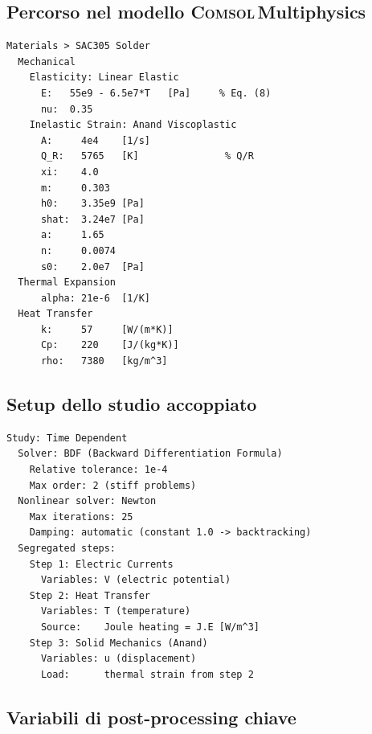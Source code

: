 \documentclass[11pt,a4paper]{article}
\newcommand{\comsol}{\textsc{Comsol}\,Multiphysics}
\begin{document}
\subsection{Percorso nel modello \comsol{}}

\begin{lstlisting}[language={}, caption={Configurazione materiale Anand in COMSOL (v6.x)}]
Materials > SAC305 Solder
  Mechanical
    Elasticity: Linear Elastic
      E:   55e9 - 6.5e7*T   [Pa]     % Eq. (8)
      nu:  0.35
    Inelastic Strain: Anand Viscoplastic
      A:     4e4    [1/s]
      Q_R:   5765   [K]               % Q/R
      xi:    4.0
      m:     0.303
      h0:    3.35e9 [Pa]
      shat:  3.24e7 [Pa]
      a:     1.65
      n:     0.0074
      s0:    2.0e7  [Pa]
  Thermal Expansion
      alpha: 21e-6  [1/K]
  Heat Transfer
      k:     57     [W/(m*K)]
      Cp:    220    [J/(kg*K)]
      rho:   7380   [kg/m^3]
\end{lstlisting}

\subsection{Setup dello studio accoppiato}

\begin{lstlisting}[language={}, caption={Configurazione studio Time Dependent --- multifisica segregata}]
Study: Time Dependent
  Solver: BDF (Backward Differentiation Formula)
    Relative tolerance: 1e-4
    Max order: 2 (stiff problems)
  Nonlinear solver: Newton
    Max iterations: 25
    Damping: automatic (constant 1.0 -> backtracking)
  Segregated steps:
    Step 1: Electric Currents
      Variables: V (electric potential)
    Step 2: Heat Transfer
      Variables: T (temperature)
      Source:    Joule heating = J.E [W/m^3]
    Step 3: Solid Mechanics (Anand)
      Variables: u (displacement)
      Load:      thermal strain from step 2
\end{lstlisting}

\subsection{Variabili di post-processing chiave}
\end{document}
